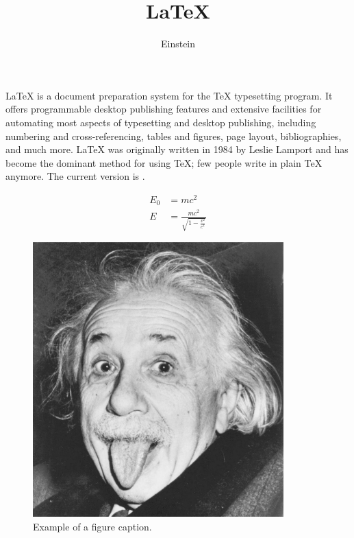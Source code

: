 \documentclass{scrarticle}
\title{\LaTeX}
\author{Einstein}
\begin{document}
\maketitle

\LaTeX{} is a document preparation system for the \TeX{} typesetting program. It offers programmable desktop publishing features and extensive facilities for automating most aspects of typesetting and desktop publishing, including numbering and  cross-referencing, tables and figures, page layout, bibliographies, and much more. \LaTeX{} was originally written in 1984 by Leslie Lamport and has become the  dominant method for using \TeX; few people write in plain \TeX{} anymore. The current version is \LaTeXe.

\begin{align}
E_0 &= mc^2 \\
E &= \frac{mc^2}{\sqrt{1-\frac{v^2}{c^2}}}
\end{align}

\begin{figure}[htbp]
\centerline{\includegraphics[width=0.3\linewidth]{einstein}}
\caption{Example of a figure caption.}
\label{fig}
\end{figure}
\end{document}
